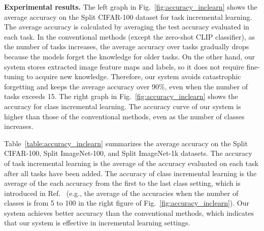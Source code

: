 \documentclass[runningheads]{llncs}
\begin{document}
\noindent
\textbf{Experimental results.} The left graph in Fig.~\ref{fig:accuracy_inclearn} shows the average accuracy on the Split CIFAR-100 dataset for task incremental learning.
The average accuracy is calculated by averaging the test accuracy evaluated in each task. 
In the conventional methods (except the zero-shot CLIP classifier),
as the number of tasks increases, the average accuracy over tasks gradually drops because the models forget the knowledge for older tasks.
On the other hand, our system stores extracted image feature maps and labels, so it does not require fine-tuning to acquire new knowledge.
Therefore, our system avoids catastrophic forgetting and keeps the average accuracy over 90\%, even when the number of tasks exceeds 15.
The right graph in Fig.~\ref{fig:accuracy_inclearn} shows the accuracy for class incremental learning.
The accuracy curve of our system is higher than those of the conventional methods, even as the number of classes increases.

Table~\ref{table:accuracy_inclearn} summarizes the average accuracy on the Split CIFAR-100, Split ImageNet-100, and Split ImageNet-1k datasets.
The accuracy of task incremental learning is the average of the accuracy evaluated on each task after all tasks have been added.
The accuracy of class incremental learning is the average of the each accuracy from the first to the last class setting, which is introduced in Ref.~\cite{iCaRL}
(e.g., the average of the accuracies when the number of classes is from 5 to 100 in the right figure of Fig.~\ref{fig:accuracy_inclearn}).
Our system achieves better accuracy than the conventional methods, which indicates that our system is effective in incremental learning settings.
\end{document}
